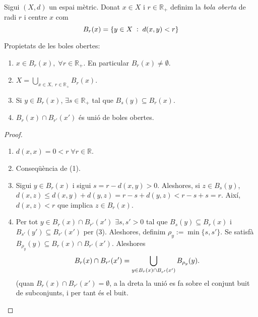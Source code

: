 \documentclass[../main.tex]{subfiles}
\begin{document}
\begin{defi}
\label{def:bolaoberta} Sigui $(X,d)$ un espai mètric. Donat $x\in X$ i $r\in\mathbb{R}_+$ definim la \textit{bola oberta} de radi $r$ i centre $x$ com
\begin{equation}
    \notag
    B_r(x) = \{y\in X\;:\;d(x,y)<r\}
\end{equation}
\end{defi}

\begin{lema}
\label{lema:propietatsbolesobertes} Propietats de les boles obertes:
\begin{enumerate}[(1)]
    \item $x\in B_r(x),\;\forall r\in \mathbb{R}_+$. En particular $B_r(x)\not=\emptyset$.
    \item $X = \bigcup_{x\in X,\;r\in\mathbb{R}_+} B_r(x)$.
    \item Si $y\in B_r(x)$, $\exists s\in \mathbb{R}_+$ tal que $B_s(y) \subseteq B_r(x)$.
    \item $B_r(x)\cap B_{r'}(x')$ és unió de boles obertes.
\end{enumerate}
\end{lema}
\begin{proof}
\begin{enumerate}[(1)]
    \item $d(x,x) = 0<r\;\forall r\in\mathbb{R}$.
    \item Conseqüència de (1).
    \item Sigui $y\in B_r(x)$ i sigui $s = r-d(x,y)>0$. Aleshores, si $z\in B_s(y)$, $d(x,z)\leq d(x,y)+d(y,z) = r-s+d(y,z)<r-s+s = r$. Així, $d(x,z)< r$ que implica $z\in B_r(x)$.
    \item Per tot $y\in B_r(x)\cap B_{r'}(x')$ $\exists s,s'>0$ tal que $B_s(y)\subseteq B_r(x)$ i $B_{s'}(y')\subseteq B_{r'}(x')$ per (3). Aleshores, definim $\rho_y:=\min\{s,s'\}$. Se satisfà $B_{\rho_y}(y)\subseteq B_r(x)\cap B_{r'}(x')$. Aleshores
    \begin{equation}
        \notag
        B_r(x)\cap B_{r'}(x') = \bigcup_{y\in B_r(x)\cap B_{r'}(x')} B_{\rho_y}(y).
    \end{equation}
    (quan $B_r(x)\cap B_{r'}(x') = \emptyset$, a la dreta la unió es fa sobre el conjunt buit de subconjunts, i per tant és el buit.
\end{enumerate}
\end{proof}
\end{document}

